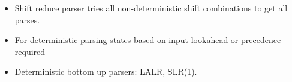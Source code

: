 \begin{frame}
\begin{itemize}
\item Shift reduce parser tries all non-deterministic shift combinations to get all
	parses.
\item For deterministic parsing states based on input lookahead or
	precedence required
\item Deterministic bottom up parsers: LALR, SLR(1).
\end{itemize}
\end{frame}

